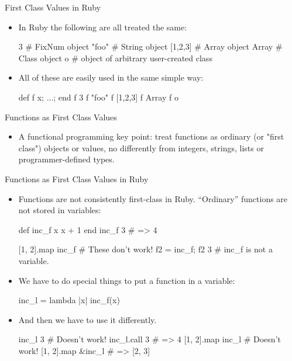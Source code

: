 \documentclass[xcolor=dvipsnames]{beamer}          %
\begin{document}
\begin{frame}[fragile]{First Class Values in Ruby}
\begin{itemize}
    \item In Ruby the following are all treated the same:
        \begin{rlisting}
            3           # FixNum object
            "foo"       # String object
            [1,2,3]     # Array object
            Array       # Class object
            o           # object of arbitrary user-created class
        \end{rlisting}
    \item All of these are easily used in the same simple way:
        \begin{rlisting}
            def f x; ...; end
            f 3
            f "foo"
            f [1,2,3]
            f Array
            f o
        \end{rlisting}
\end{itemize}
\end{frame}


\begin{frame}[fragile]{Functions as First Class Values}
\begin{itemize}
    \item A functional programming key point: treat functions as
        ordinary (or "first class") objects or values, no differently
        from integers, strings, lists or programmer-defined types.
\end{itemize}
\end{frame}


\begin{frame}[fragile]{Functions as First Class Values in Ruby}
\begin{itemize}
    \item Functions are not consistently first-class in Ruby.
        ``Ordinary'' functions are not stored in variables:
        \begin{rlisting}
            def inc_f x
                x + 1
            end
            inc_f 3                     # => 4

            [1, 2].map inc_f            # These don't work!
            f2 = inc_f; f2 3            # inc_f is not a variable.
        \end{rlisting}
    \item We have to do special things to put a function in a variable:
        \begin{rlisting}
            inc_l = lambda { |x| inc_f(x) }
        \end{rlisting}
    \item And then we have to use it differently.
        \begin{rlisting}
            inc_l 3                     # Doesn't work!
            inc_l.call 3                # => 4
            [1, 2].map inc_l            # Doesn't work!
            [1, 2].map &inc_l           # => [2, 3]
        \end{rlisting}
\end{itemize}
\end{frame}
\end{document}
